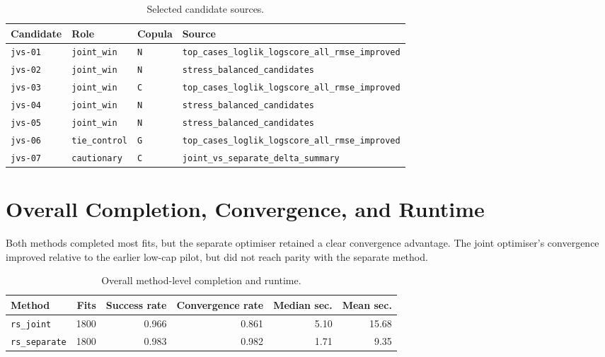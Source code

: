 \documentclass[11pt]{article}
\begin{document}
\begin{table}[ht]
\centering
\caption{Selected candidate sources.}
\begin{tabular}{llll}
\toprule
Candidate & Role & Copula & Source \\
\midrule
\texttt{jvs-01} & \texttt{joint\_win} & \texttt{N} &
\texttt{top\_cases\_loglik\_logscore\_all\_rmse\_improved} \\
\texttt{jvs-02} & \texttt{joint\_win} & \texttt{N} &
\texttt{stress\_balanced\_candidates} \\
\texttt{jvs-03} & \texttt{joint\_win} & \texttt{C} &
\texttt{top\_cases\_loglik\_logscore\_all\_rmse\_improved} \\
\texttt{jvs-04} & \texttt{joint\_win} & \texttt{N} &
\texttt{stress\_balanced\_candidates} \\
\texttt{jvs-05} & \texttt{joint\_win} & \texttt{N} &
\texttt{stress\_balanced\_candidates} \\
\texttt{jvs-06} & \texttt{tie\_control} & \texttt{G} &
\texttt{top\_cases\_loglik\_logscore\_all\_rmse\_improved} \\
\texttt{jvs-07} & \texttt{cautionary} & \texttt{C} &
\texttt{joint\_vs\_separate\_delta\_summary} \\
\bottomrule
\end{tabular}
\end{table}

\section{Overall Completion, Convergence, and Runtime}

Both methods completed most fits, but the separate optimiser retained a clear
convergence advantage.  The joint optimiser's convergence improved relative to
the earlier low-cap pilot, but did not reach parity with the separate method.

\begin{table}[ht]
\centering
\caption{Overall method-level completion and runtime.}
\begin{tabular}{lrrrrr}
\toprule
Method & Fits & Success rate & Convergence rate & Median sec. & Mean sec. \\
\midrule
\texttt{rs\_joint} & 1800 & 0.966 & 0.861 & 5.10 & 15.68 \\
\texttt{rs\_separate} & 1800 & 0.983 & 0.982 & 1.71 & 9.35 \\
\bottomrule
\end{tabular}
\end{table}
\end{document}
